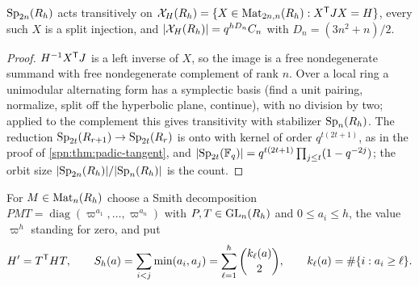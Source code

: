 \begin{lemma}\label{spn:lem:local-frames}
$\operatorname{Sp}_{2n}(R_h)$ acts transitively on $\mathcal X_H(R_h)=\{X\in\operatorname{Mat}_{2n,n}(R_h):X^{\mathsf{T}}JX=H\}$,
every such $X$ is a split injection, and $\lvert\mathcal X_H(R_h)\rvert=q^{hD_n}C_n$ with $D_n=(3n^2+n)/2$.
\end{lemma}
\begin{proof}
$H^{-1}X^{\mathsf{T}}J$ is a left inverse of $X$, so the image is a free nondegenerate summand with free
nondegenerate complement of rank $n$. Over a local ring a unimodular alternating form has a
symplectic basis (find a unit pairing, normalize, split off the hyperbolic plane, continue), with no
division by two; applied to the complement this gives transitivity with stabilizer $\operatorname{Sp}_n(R_h)$. The
reduction $\operatorname{Sp}_{2t}(R_{r+1})\to\operatorname{Sp}_{2t}(R_r)$ is onto with kernel of order $q^{t(2t+1)}$, as in the
proof of \cref{spn:thm:padic-tangent}, and
$\lvert\operatorname{Sp}_{2t}(\mathbb{F}_q)\rvert=q^{t(2t+1)}\prod_{j\le t}(1-q^{-2j})$; the orbit size
$\lvert\operatorname{Sp}_{2n}(R_h)\rvert/\lvert\operatorname{Sp}_n(R_h)\rvert$ is the count.
\end{proof}

For $M\in\operatorname{Mat}_n(R_h)$ choose a Smith decomposition $PMT=\operatorname{diag}(\varpi^{a_1},\dots,\varpi^{a_n})$
with $P,T\in\operatorname{GL}_n(R_h)$ and $0\le a_i\le h$, the value $\varpi^h$ standing for zero, and put
\[
 H'=T^{\mathsf{T}}HT,\qquad S_h(a)=\sum_{i<j}\min(a_i,a_j)=\sum_{\ell=1}^h\binom{k_\ell(a)}2,\qquad
 k_\ell(a)=\#\{i:a_i\ge\ell\}.
\]

